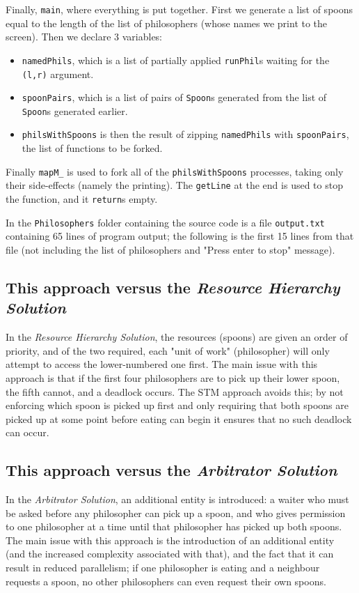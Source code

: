 \documentclass[12pt]{article}
\begin{document}
Finally, \verb|main|, where everything is put together.
First we generate a list of spoons equal to the length of the list of philosophers (whose names we print to the screen).
Then we declare 3 variables:
\begin{itemize}
  \item \verb|namedPhils|, which is a list of partially applied \verb|runPhil|s waiting for the \verb|(l,r)| argument.
  \item \verb|spoonPairs|, which is a list of pairs of \verb|Spoon|s generated from the list of \verb|Spoon|s generated earlier.
  \item \verb|philsWithSpoons| is then the result of zipping \verb|namedPhils| with \verb|spoonPairs|, the list of functions to be forked.
\end{itemize}

Finally \verb|mapM_| is used to fork all of the \verb|philsWithSpoons| processes, taking only their side-effects (namely the printing).
The \verb|getLine| at the end is used to stop the function, and it \verb|return|s empty.
\par
In the \verb|Philosophers| folder containing the source code is a file \verb|output.txt| containing 65 lines of program output; the following is the first 15 lines from that file (not including the list of philosophers and "Press enter to stop" message).



\subsection{This approach versus the \textit{Resource Hierarchy Solution}}
In the \textit{Resource Hierarchy Solution}, the resources (spoons) are given an order of priority, and  of the two required, each "unit of work" (philosopher) will only attempt to access the lower-numbered one first.
The main issue with this approach is that if the first four philosophers are to pick up their lower spoon, the fifth cannot, and a deadlock occurs.
The STM approach avoids this; by not enforcing which spoon is picked up first and only requiring that both spoons are picked up at some point before eating can begin it ensures that no such deadlock can occur.

\subsection{This approach versus the \textit{Arbitrator Solution}}
In the \textit{Arbitrator Solution}, an additional entity is introduced: a waiter who must be asked before any philosopher can pick up a spoon, and who gives permission to one philosopher at a time until that philosopher has picked up both spoons.
The main issue with this approach is the introduction of an additional entity (and the increased complexity associated with that), and the fact that it can result in reduced parallelism; if one philosopher is eating and a neighbour requests a spoon, no other philosophers can even request their own spoons.
\end{document}
